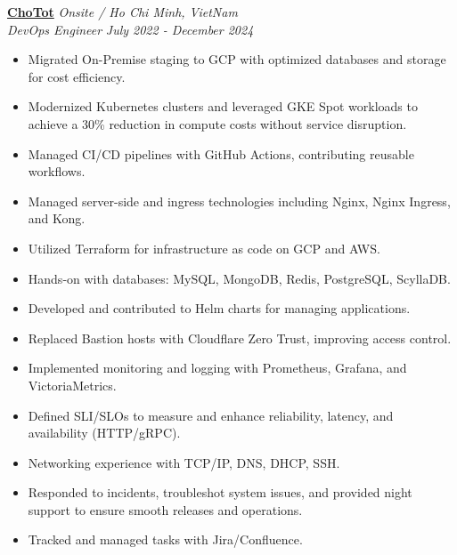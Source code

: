 \documentclass[11pt, a4paper]{article}
\begin{document}
\vspace{0.5em}
\textbf{\href{https://www.chotot.com/}{ChoTot}} \hfill {\small\textit{Onsite / Ho Chi Minh, VietNam}} \\
\textit{DevOps Engineer} \hfill {\small\textit{July 2022 - December 2024}}
\begin{itemize}[leftmargin=*]
    \item Migrated On-Premise staging to GCP with optimized databases and storage for cost efficiency.
    \item Modernized Kubernetes clusters and leveraged GKE Spot workloads to achieve a 30\% reduction in compute costs without service disruption.
    \item Managed CI/CD pipelines with GitHub Actions, contributing reusable workflows.
    \item Managed server-side and ingress technologies including Nginx, Nginx Ingress, and Kong.
    \item Utilized Terraform for infrastructure as code on GCP and AWS.
    \item Hands-on with databases: MySQL, MongoDB, Redis, PostgreSQL, ScyllaDB.
    \item Developed and contributed to Helm charts for managing applications.
    \item Replaced Bastion hosts with Cloudflare Zero Trust, improving access control.
    \item Implemented monitoring and logging with Prometheus, Grafana, and VictoriaMetrics.
    \item Defined SLI/SLOs to measure and enhance reli\-abil\-ity, la\-ten\-cy, and avail\-abil\-ity (HTTP/\-gRPC).
    \item Networking experience with TCP/IP, DNS, DHCP, SSH.
    \item Responded to incidents, troubleshot system issues, and provided night support to ensure smooth releases and operations.
    \item Tracked and managed tasks with Jira/Confluence.
\end{itemize}
\end{document}
